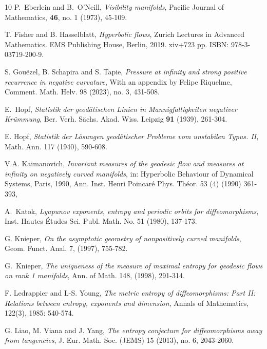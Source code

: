 \documentclass[11pt]{amsart}
\theoremstyle{definition}
\begin{document}
\begin{thebibliography}{10}
P.~Eberlein and B.~O'Neill, \emph{Visibility manifolds}, Pacific Journal of Mathematics, {\bf 46}, no. 1 (1973), 45-109.

T. Fisher and B. Hasselblatt, \emph{Hyperbolic flows}, Zurich Lectures in Advanced Mathematics. EMS Publishing House, Berlin, 2019. xiv+723 pp. ISBN: 978-3-03719-200-9.


S. Gou\"{e}zel, B. Schapira and S. Tapie, \emph{Pressure at infinity and strong positive recurrence in negative curvature}, With an appendix by Felipe Riquelme, Comment. Math. Helv. 98 (2023), no. 3, 431-508. 


E.~Hopf, \emph{Statistik der geod\"{a}tischen Linien in Mannigfaltigkeiten negativer Kr\"{u}mmung}, Ber. Verh. S\"{a}chs. Akad. Wiss. Leipzig  {\bf 91} (1939), 261-304.

E. Hopf, \emph{Statistik der L\"{o}sungen geod\"{a}tischer Probleme vom unstabilen Typus. II}, Math.
Ann. 117 (1940), 590-608.


V.A. Kaimanovich, \emph{Invariant measures of the geodesic flow and measures at infinity on negatively curved manifolds}, in: Hyperbolic Behaviour of Dynamical Systems, Paris, 1990, Ann. Inst. Henri 
Poincar\'e Phys. Th\'eor. 53 (4) (1990) 361-393, 

A.~Katok, \emph{Lyapunov exponents, entropy and periodic orbits for diffeomorphisms}, Inst. Hautes Études Sci. Publ. Math. No. 51 (1980), 137-173.



 G. Knieper, \emph{On the asymptotic geometry of nonpositively curved manifolds}, Geom. Funct. Anal. 7, (1997), 755-782.

G.~Knieper, \emph{The uniqueness of the measure of maximal entropy for geodesic flows on rank 1 manifolds}, Ann. of Math. 148, (1998), 291-314.

F. Ledrappier and L-S. Young, \emph{The metric entropy of diffeomorphisms: Part II: Relations between entropy, exponents and dimension}, Annals of Mathematics, 122(3), 1985: 540-574.

G. Liao, M. Viana and J. Yang, \emph{The entropy conjecture for diffeomorphisms away from tangencies}, J. Eur. Math. Soc. (JEMS) 15 (2013), no. 6, 2043-2060.


\end{thebibliography}
\end{document}
